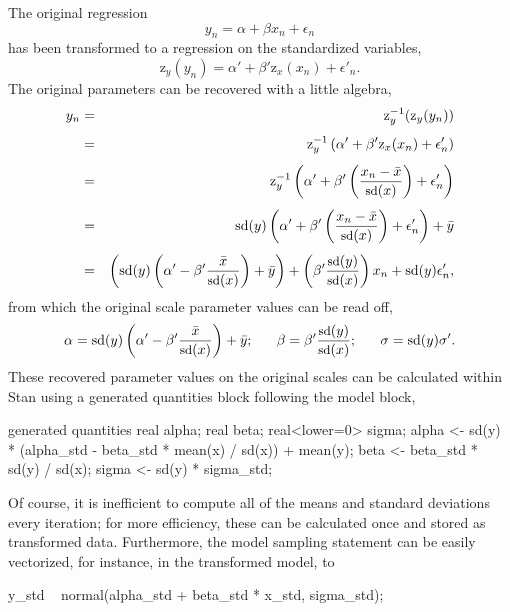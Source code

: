 The original regression
\[
y_n 
= \alpha + \beta x_n + \epsilon_n
\]
has been transformed to a regression on the standardized variables,
\[
\mbox{z}_y(y_n)
= \alpha'
+ \beta' \mbox{z}_x(x_n)
+ \epsilon'_n.
\]
The original parameters can be recovered with a little algebra,
%
\begin{eqnarray*}
y_n 
& = & \mbox{z}_y^{-1}(\mbox{z}_y(y_n))
\\[4pt]
& = & 
\mbox{z}_y^{-1} 
\left( 
\alpha' 
+ \beta' \mbox{z}_x(x_n)
+ \epsilon_n'
\right)
\\[4pt]
& = & 
\mbox{z}_y^{-1} 
\left( 
\alpha' 
+ \beta' 
    \left(  
      \frac{x_n - \bar{x}}{\mbox{\small sd}(x)}
    \right)
+ \epsilon_n'
\right)
\\[4pt]
& = & 
\mbox{sd}(y)
\left( 
\alpha' 
+ \beta' 
    \left(  
      \frac{x_n - \bar{x}}{\mbox{\small sd}(x)}
    \right)
+ \epsilon_n'
\right)
+ \bar{y}
\\[4pt]
& = & 
\left( 
  \mbox{sd}(y) 
      \left( 
          \alpha' 
          - \beta' \frac{\bar{x}}{\mbox{\small sd}(x)}
      \right) 
  + \bar{y}  
\right)
+ \left(
      \beta' \frac{\mbox{\small sd}(y)}{\mbox{\small sd}(x)} 
  \right) x_n
+ \mbox{sd}(y) \epsilon'_n,
\end{eqnarray*}
%
from which the original scale parameter values can be read off,
\[
\alpha 
=
\mbox{sd}(y) 
      \left( 
          \alpha' 
          - \beta' \frac{\bar{x}}{\mbox{\small sd}(x)}
      \right) 
  + \bar{y};
\ \ \ \ \ 
\beta = \beta' \frac{\mbox{\small sd}(y)}{\mbox{\small sd}(x)};
\ \ \ \ \
\sigma = \mbox{sd}(y) \sigma'.
\]
%
These recovered parameter values on the original scales can be
calculated within Stan using a generated quantities block following
the model block,
\begin{stancode}
generated quantities {
  real alpha;
  real beta;
  real<lower=0> sigma;
  alpha <- sd(y) * (alpha_std - beta_std * mean(x) / sd(x)) 
           + mean(y);
  beta <- beta_std * sd(y) / sd(x);
  sigma <- sd(y) * sigma_std;
}
\end{stancode}
%
Of course, it is inefficient to compute all of the means and standard
deviations every iteration; for more efficiency, these can be
calculated once and stored as transformed data.  Furthermore, the
model sampling statement can be easily vectorized, for instance, in
the transformed model, to
\begin{stancode}
    y_std ~ normal(alpha_std + beta_std * x_std, sigma_std);
\end{stancode}



